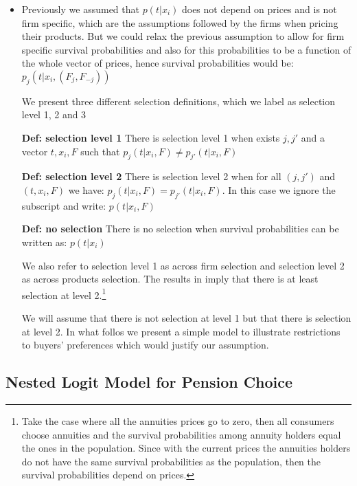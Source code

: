 \documentclass[12pt]{article}
\theoremstyle{plain}
\theoremstyle{plain}
\begin{document}
\begin{itemize}
\item Previously we assumed that $p(t|x_{i})$ does not depend on prices and is not firm specific, which are the assumptions followed by the firms when pricing their products. 
But we could relax the previous assumption to allow 
 for firm specific survival probabilities and also for this probabilities to be a function of the whole vector of prices, hence survival probabilities would be:   $p_j(t|x_{i}, (F_j, F_{-j}))$ 


We present three different selection definitions, which we label as selection level 1, 2 and 3

\textbf{Def: selection level 1} 
There is selection level 1 when exists $j,j'$ and a vector $t,x_{i},F$ such that  $p_j(t|x_{i}, F) \neq p_{j'}(t|x_{i}, F)$

\textbf{Def: selection level 2} 
There is selection level 2 when
for all $(j,j')$ and $(t,x_{i},F)$ we have: 
$p_j(t|x_{i}, F) = p_{j'}(t|x_{i}, F)$. In this case we ignore the subscript and write: $p(t|x_{i}, F)$ 

\textbf{Def: no selection} 
There is no selection  when  survival probabilities can be written as:   $p(t|x_{i})$

We also refer to selection level 1 as across firm selection and selection level 2 as across products selection. The results in \textcite{illanes_retirement_2019} imply that there is at least selection at level 2.\footnote{Take the case where all the annuities prices go to zero, then all consumers choose annuities and the survival probabilities among annuity holders equal the ones in the population. Since with the current prices the annuities holders do not have the same survival probabilities as the population, then the survival probabilities depend on prices.}




We will assume that there is not selection at level 1 but that there is selection at level 2. In what follos we present a simple model to illustrate restrictions to buyers' preferences which would justify our assumption. 



\end{itemize}


\subsection*{Nested Logit Model for Pension Choice}
\end{document}
